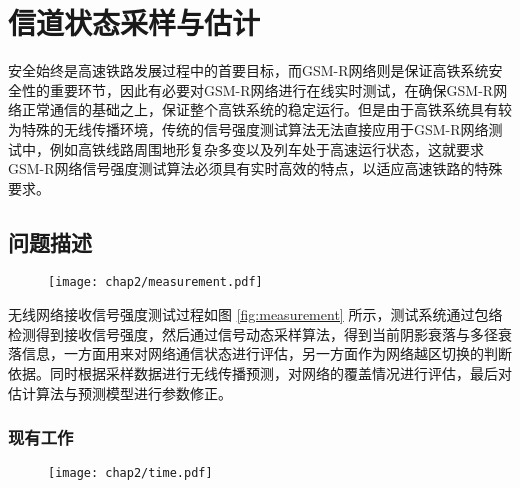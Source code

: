 

\chapter{信道状态采样与估计}
\label{chap:phy}

安全始终是高速铁路发展过程中的首要目标，而GSM-R网络则是保证高铁系统安全性的重要环节，因此有必要对GSM-R网络进行在线实时测试，在确保GSM-R网络正常通信的基础之上，保证整个高铁系统的稳定运行。但是由于高铁系统具有较为特殊的无线传播环境，传统的信号强度测试算法无法直接应用于GSM-R网络测试中，例如高铁线路周围地形复杂多变以及列车处于高速运行状态，这就要求GSM-R网络信号强度测试算法必须具有实时高效的特点，以适应高速铁路的特殊要求。

\section{问题描述}
\label{sec:problem2}

\begin{figure}[!htp]
\centering
\texttt{[image: chap2/measurement.pdf]}
\end{figure}

无线网络接收信号强度测试过程如图 \ref{fig:measurement} 所示，测试系统通过包络检测得到接收信号强度，然后通过信号动态采样算法，得到当前阴影衰落与多径衰落信息，一方面用来对网络通信状态进行评估，另一方面作为网络越区切换的判断依据。同时根据采样数据进行无线传播预测，对网络的覆盖情况进行评估，最后对估计算法与预测模型进行参数修正。

\subsection{现有工作}
\label{sec:current3}

\begin{figure}[!htp]
\centering
    \texttt{[image: chap2/time.pdf]}
\end{figure}


